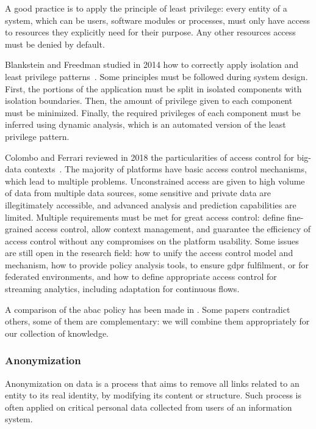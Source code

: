 A good practice is to apply the principle of least privilege: every entity of a system, which can be users, software modules or processes, must only have access to resources they explicitly need for their purpose. Any other resources access must be denied by default. 

Blankstein and Freedman studied in 2014 how to correctly apply isolation and least privilege patterns~\cite{blankstein_automating_2014}. Some principles must be followed during system design. First, the portions of the application must be split in isolated components with isolation boundaries. Then, the amount of privilege given to each component must be minimized. Finally, the required privileges of each component must be inferred using dynamic analysis, which is an automated version of the least privilege pattern. %

Colombo and Ferrari reviewed in 2018 the particularities of access control for \gls{big-data} contexts~\cite{colombo_access_2018}. The majority of platforms have basic access control mechanisms, which lead to multiple problems. Unconstrained access are given to high volume of data from multiple data sources, some sensitive and private data are illegitimately accessible, and advanced analysis and prediction capabilities are limited. Multiple requirements must be met for great access control: define fine-grained access control, allow context management, and guarantee the efficiency of access control without any compromises on the platform usability. Some issues are still open in the research field: how to unify the access control model and mechanism, how to provide policy analysis tools, to ensure \gls{gdpr} fulfilment, or for federated environments, and how to define appropriate access control for streaming analytics, including adaptation for continuous flows. %

A comparison of the \gls{abac} policy has been made in . Some papers contradict others, some of them are complementary: we will combine them appropriately for our collection of knowledge.

\subsubsection{Anonymization}
\label{subsubsec:state_review_results_anonymization}

Anonymization on data is a process that aims to remove all links related to an entity to its real identity, by modifying its content or structure. Such process is often applied on critical personal data collected from users of an information system.

